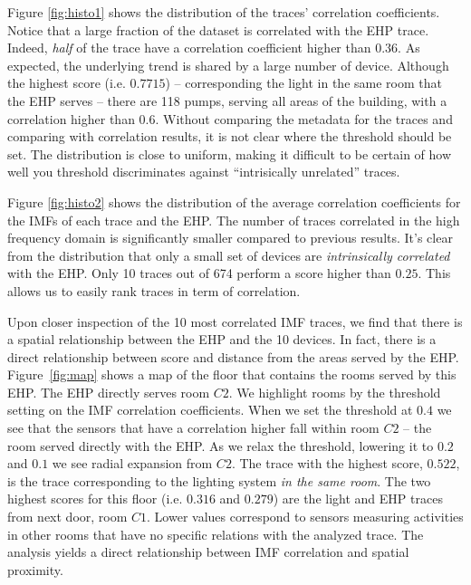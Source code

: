 Figure \ref{fig:histo1} shows the distribution of the traces' correlation coefficients.  Notice
that a large fraction of the dataset is correlated with the EHP trace.
Indeed, \emph{half} of the trace have a correlation coefficient higher than $0.36$.  As expected, the underlying
trend is shared by a large number of device.
Although the highest score (i.e. $0.7715$) -- corresponding the light in the same room that the EHP serves --
there are 118 pumps, serving all areas of the building, with a correlation higher than $0.6$.
Without comparing the metadata for the traces and comparing with correlation results, it is not clear
where the threshold should be set.  The distribution is close to uniform, making it difficult to 
be certain of how well you threshold discriminates against ``intrisically unrelated'' traces.

Figure \ref{fig:histo2} shows the distribution of the average correlation coefficients for the IMFs of
each trace and the EHP.  The number of traces correlated in the high frequency domain is significantly smaller
compared to previous results. It's clear from the distribution that only a small set of devices are
\emph{intrinsically correlated} with the EHP.  Only 10 traces out of 674 perform a score higher than 
$0.25$. This allows us to easily rank traces in term of correlation.

Upon closer inspection of the 10 most correlated IMF traces, we find that there is a spatial relationship
between the EHP and the 10 devices.  In fact, there is a direct relationship between score and distance from
the areas served by the EHP.  Figure~\ref{fig:map} shows a map of the floor that contains the rooms served by this
EHP.  The EHP directly serves room $C2$.  We highlight rooms by the threshold setting on the IMF correlation coefficients.
When we set the threshold at $0.4$ we see that the sensors that have a correlation higher fall within room $C2$ --
the room served directly with the EHP.  As we relax the threshold, lowering it to $0.2$ and $0.1$ we see radial expansion from $C2$.  The trace with the highest score, $0.522$, is the trace corresponding to the lighting system \emph{in
the same room}.
The two highest scores for this floor (i.e. $0.316$ and $0.279$) are the light and EHP traces from next door, room $C1$.
Lower values correspond to sensors measuring activities in other rooms that have no specific relations with the analyzed trace.  The analysis yields a direct relationship between IMF correlation and spatial proximity.




